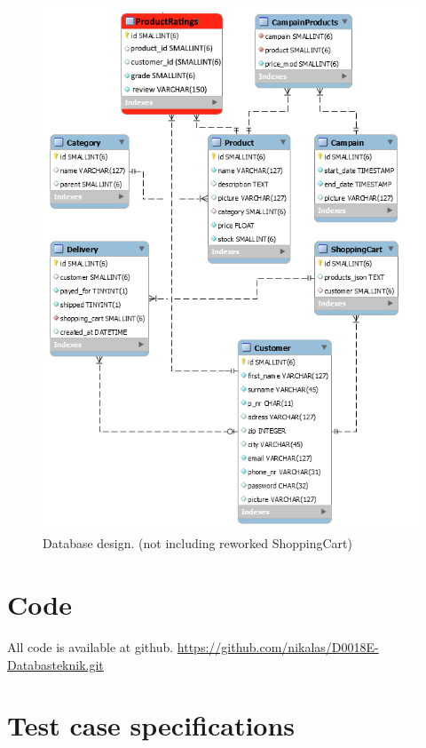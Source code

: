 \documentclass[paper=a4, fontsize=11pt]{report} %
\begin{document}
\begin{itemize}
\begin{figure}
	\includegraphics[width=\textwidth]{artifacts/db_implemented_1_3.png}
	\caption{Database design. (not including reworked ShoppingCart)}
	\label{fig:db}
\end{figure}

\section*{Code}
All code is available at github.
\url{https://github.com/nikalas/D0018E-Databasteknik.git}

\section*{Test case specifications}



\end{itemize}
\end{document}
